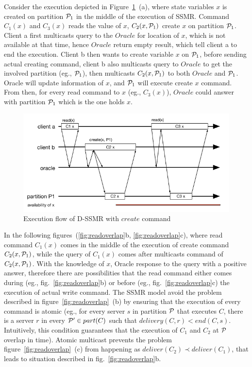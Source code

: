 Consider the execution depicted in Figure~\ref{fig:read}~(a), where state variables $x$ is created on partition $\mathcal{P}_1$ in the middle of the execution of SSMR. Command $C_1(x)$ and $C_3(x)$ reads the value of $x$, $C_2(x,\mathcal{P}_1)$ create $x$ on partition $\mathcal{P}_1$. Client a first multicasts query to the $Oracle$ for location of $x$, which is not available at that time, hence $Oracle$ return empty result, which tell client a to end the execution. Client b then wants to create variable $x$ on $\mathcal{P}_1$, before sending actual creating command, client b also multicasts query to $Oracle$ to get the involved partition (eg., $\mathcal{P}_1$), then multicasts $C_2(x,\mathcal{P}_1)$ to both $Oracle$ and $\mathcal{P}_1$. Oracle will update information of $x$, and $\mathcal{P}_1$ will execute create $x$ command. From then, for every read command to $x$ (eg., $C_3(x)$), $Oracle$ could answer with partition $\mathcal{P}_1$ which is the one holds $x$.

\begin{figure}
\begin{minipage}[b]{1.0\linewidth} %
\centering
      \includegraphics[width=0.6\linewidth]{figures/read_simple}
\end{minipage}
\centering
	\caption{Execution flow of D-SSMR with $create$ command}
\label{fig:read}
\end{figure}

In the following figures~(\ref{fig:readoverlap}b, \ref{fig:readoverlap}c), where read command $C_1(x)$ comes in the middle of the execution of create command $C_2(x,\mathcal{P}_1)$, while the query of $C_1(x)$ comes after multicasts command of $C_2(x,\mathcal{P}_1)$. With the knowledge of $x$, Oracle response to the query with a positive answer, therefore there are possibilities that the read command either comes during (eg., fig.~\ref{fig:readoverlap}b) or before (eg., fig.~\ref{fig:readoverlap}c) the execution of actual write command. The SSMR model avoid the problem described in figure~\ref{fig:readoverlap}~(b) by ensuring that the execution of every command is atomic (eg., for every server $s$ in partition $\mathcal{P}$ that executes $C$, there is a server $r$ in every $\mathcal{P}' \in part(C)$ such that $delivery(C,r) < end(C,s)$. Intuitively, this condition guarantees that the execution of $C_1$ and $C_2$ at $\mathcal{P}$ overlap in time). Atomic multicast prevents the problem figure~\ref{fig:readoverlap}~(c) from happening as $deliver(C_2) \prec deliver(C_1)$, that leads to situation described in fig.~\ref{fig:readoverlap}b.

